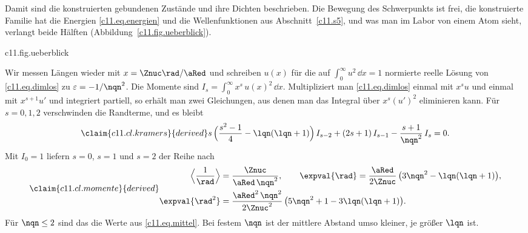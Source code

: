 Damit sind die konstruierten gebundenen Zustände und ihre Dichten beschrieben. Die
Bewegung des Schwerpunkts ist frei, die konstruierte Familie hat die Energien
\eqref{c11.eq.energien} und die Wellenfunktionen aus Abschnitt~\ref{c11.s5}, und was man
im Labor von einem Atom sieht, verlangt beide Hälften (Abbildung~\ref{c11.fig.ueberblick}).

\begin{tpcfigure}{c11.fig.ueberblick}
  \caption{Der Weg des Kapitels als Schema. Aus dem Zweiteilchenproblem werden zwei unabhängige Probleme; die Relativbewegung liefert Energien und Wellenfunktionen. Mit dem Labor verglichen werden die Differenzen der Energien, als Spektrallinien, und Dichten, in die der Zustand des Schwerpunkts eingeht.}
\end{tpcfigure}


\begin{vertiefung}[id=c11.v5,
    titel={Momente und Verteilungsfunktion},
    wozu={Der Kern berechnet mittlere Abstände für $\nqn \leq 2$ einzeln. Hier steht
      eine Formel für alle Zustände, dazu die Wahrscheinlichkeit, den Abstand unterhalb
      eines gegebenen Radius zu finden.},
    voraussetzung={Kern~\ref{c11.s7}; für den allgemeinen Fall die Radialfunktionen aus
      Vertiefung~\ref{c11.v2}.},
    zurueck={Mittlere Abstände und eingeschlossene Wahrscheinlichkeiten gibt es für
      jeden Zustand als Formel, ohne numerische Integration.}]
  Wir messen Längen wieder mit $x = \Znuc\rad/\aRed$ und schreiben $u(x)$ für die auf
  $\int_0^\infty u^2\,\dd x = 1$ normierte reelle Lösung von \eqref{c11.eq.dimlos} zu
  $\varepsilon = -1/\nqn^2$. Die Momente sind $I_s = \int_0^\infty x^s\,u(x)^2\,\dd x$.
  Multipliziert man \eqref{c11.eq.dimlos} einmal mit $x^s u$ und einmal mit
  $x^{s + 1} u'$ und integriert partiell, so erhält man zwei Gleichungen, aus denen man
  das Integral über $x^s (u')^2$ eliminieren kann. Für $s = 0, 1, 2$ verschwinden die
  Randterme, und es bleibt
  \begin{equation}\label{c11.eq.kramers}\claim{c11.cl.kramers}{derived}
    s\,\Bigl(\frac{s^2 - 1}{4} - \lqn(\lqn + 1)\Bigr)\,I_{s - 2}
    + (2s + 1)\,I_{s - 1} - \frac{s + 1}{\nqn^2}\,I_s = 0 .
  \end{equation}
  Mit $I_0 = 1$ liefern $s = 0$, $s = 1$ und $s = 2$ der Reihe nach
  \begin{equation}\label{c11.eq.momente}\claim{c11.cl.momente}{derived}
    \begin{aligned}
      \Bigl\langle \frac{1}{\rad} \Bigr\rangle &= \frac{\Znuc}{\aRed\,\nqn^2},
      \qquad
      \expval{\rad} = \frac{\aRed}{2\Znuc}\,\bigl(3\nqn^2 - \lqn(\lqn + 1)\bigr), \\
      \expval{\rad^2} &= \frac{\aRed^2\,\nqn^2}{2\Znuc^2}\,
        \bigl(5\nqn^2 + 1 - 3\lqn(\lqn + 1)\bigr).
    \end{aligned}
  \end{equation}
  Für $\nqn \leq 2$ sind das die Werte aus \eqref{c11.eq.mittel}. Bei festem $\nqn$ ist
  der mittlere Abstand umso kleiner, je größer $\lqn$ ist.


\end{vertiefung}
